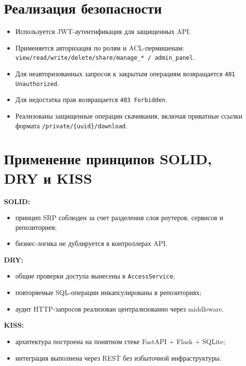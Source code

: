 \documentclass[14pt,a4paper]{extarticle}
\begin{document}
\section{Реализация безопасности}
\begin{itemize}
    \item Используется JWT-аутентификация для защищенных API.
    \item Применяется авторизация по ролям и ACL-пермишенам:
    \texttt{view/read/write/delete/share/manage\_* / admin\_panel}.
    \item Для неавторизованных запросов к закрытым операциям возвращается \texttt{401 Unauthorized}.
    \item Для недостатка прав возвращается \texttt{403 Forbidden}.
    \item Реализованы защищенные операции скачивания, включая приватные ссылки формата \texttt{/private/\{uuid\}/download}.
\end{itemize}

\section{Применение принципов SOLID, DRY и KISS}
\textbf{SOLID:}
\begin{itemize}
    \item принцип SRP соблюден за счет разделения слоя роутеров, сервисов и репозиториев;
    \item бизнес-логика не дублируется в контроллерах API.
\end{itemize}

\textbf{DRY:}
\begin{itemize}
    \item общие проверки доступа вынесены в \texttt{AccessService};
    \item повторяемые SQL-операции инкапсулированы в репозиториях;
    \item аудит HTTP-запросов реализован централизованно через middleware.
\end{itemize}

\textbf{KISS:}
\begin{itemize}
    \item архитектура построена на понятном стеке FastAPI + Flask + SQLite;
    \item интеграция выполнена через REST без избыточной инфраструктуры.
\end{itemize}
\end{document}
